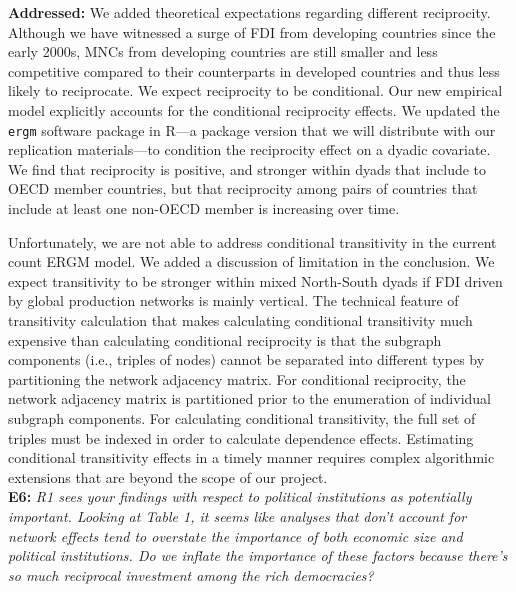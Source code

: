 \documentclass[a4paper,11pt]{texMemo}
\begin{document}
\noindent \textbf{Addressed:} We added theoretical expectations regarding different reciprocity. Although we have witnessed a surge of FDI from developing countries since the early 2000s, MNCs from developing countries are still smaller and less competitive compared to their counterparts in developed countries and thus less likely to reciprocate. We expect reciprocity to be conditional. Our new empirical model explicitly accounts for the conditional reciprocity effects. We updated the \texttt{ergm} software package in R---a package version that we will distribute with our replication materials---to condition the reciprocity effect on a dyadic covariate. We find that reciprocity is positive, and stronger within dyads that include to OECD member countries, but that reciprocity among pairs of countries that include at least one non-OECD member is increasing over time.

Unfortunately, we are not able to address conditional transitivity in the current count ERGM model. We added a discussion of limitation in the conclusion. We expect transitivity to be stronger within mixed North-South dyads if FDI driven by global production networks is mainly vertical. The technical feature of transitivity calculation that makes calculating conditional transitivity much expensive than calculating conditional reciprocity is that the subgraph components (i.e., triples of nodes) cannot be separated into different types by partitioning the network adjacency matrix. For conditional reciprocity, the network adjacency matrix is partitioned prior to the enumeration of individual subgraph components. For calculating conditional transitivity, the full set of triples must be indexed in order to calculate dependence effects. Estimating conditional transitivity effects in a timely manner requires complex algorithmic extensions that are beyond the scope of our project.  \\

\noindent \textbf{E6:} \emph{R1 sees your findings with respect to political institutions as potentially important. Looking at Table 1, it seems like analyses that don't account for network effects tend to overstate the importance of both economic size and political institutions. Do we inflate the importance of these factors because there's so much reciprocal investment among the rich democracies?}\\
\end{document}
